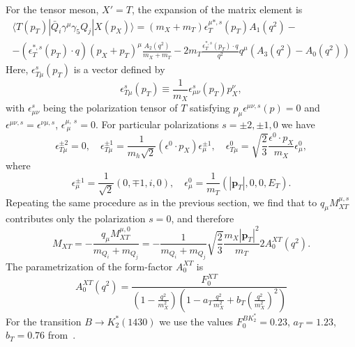 \documentclass[a4paper,12pt,dvipsnames,usernames]{article}
\begin{document}
For the tensor meson, $X' = T$, the expansion of the matrix element is~\cite{Li:2010ra,Cheng:2010yd}
    \begin{multline}
    \langle T(p_{T})| \bar{Q}_{i}\gamma^{\mu}\gamma_{5}Q_{j} |X(p_{X})\rangle = (m_{X}+m_{T})\epsilon^{\mu *,s}_{T}(p_{T})A_{1}(q^{2}) - \\ -(\epsilon^{*,s}_{T}(p_{T})\cdot q)(p_{X} + p_{T})^{\mu}\frac{A_{2}(q^{2})}{m_{X}+m_{T}}-2m_{T}\frac{\epsilon^{*,s}_{T}(p_{T})\cdot q}{q^{2}}q^{\mu}(A_{3}(q^{2})-A_{0}(q^{2}))
    \label{eq:tensor-form-factor-axial-part}
\end{multline}
Here, $\epsilon^{s}_{T\mu}(p_{T})$ is a vector defined by
\begin{equation}
    \epsilon_{T\mu}^{s}(p_{T}) \equiv  \frac{1}{m_{X}}\epsilon_{\mu\nu}^{s}(p_{T})p_{X}^{\nu},
\end{equation}
with $\epsilon_{\mu\nu}^{s}$ being the polarization tensor of $T$ satisfying $p_{\mu}\epsilon^{\mu\nu,s}(p) = 0$ and $\epsilon^{\mu\nu,s} = \epsilon^{\nu\mu,s}$, $\epsilon^{\mu, \ s}_{\ \mu} = 0$. For particular polarizations $s = \pm 2, \pm 1, 0$ we have~\cite{Li:2010ra}
\begin{equation}
    \epsilon^{\pm 2}_{T\mu} = 0, \quad \epsilon_{T\mu}^{\pm 1} = \frac{1}{m_{h}\sqrt{2}}(\epsilon^{0}\cdot p_{X})\epsilon^{\pm 1}_{\mu}, \quad \epsilon^{0}_{T\mu} = \sqrt{\frac{2}{3}}\frac{\epsilon^{0}\cdot p_{X}}{m_{X}}\epsilon_{\mu}^{0},
\end{equation}
where
\begin{equation}
    \epsilon^{\pm 1}_{\mu} = \frac{1}{\sqrt{2}}(0, \mp 1, i, 0), \quad \epsilon_{\mu}^{0} = \frac{1}{m_{T}}(|\bm{p}_{T}|,0,0,E_{T}).
\end{equation}
Repeating the same procedure as in the previous section, we find that to $q_{\mu}M^{\mu,s}_{XT}$ contributes only the polarization $s = 0$, and therefore
\begin{equation}
    M_{XT}  = -\frac{q_{\mu}M^{\mu, 0}_{XT}}{m_{Q_{i}}+m_{Q_{j}}}= -\frac{1}{m_{Q_{i}}+m_{Q_{j}}}\sqrt{\frac{2}{3}}\frac{m_{X}|\bm{p}_{T}|^{2}}{m_{T}}2 A^{XT}_{0}(q^{2}).
\end{equation}
The parametrization of the form-factor $A^{XT}_{0}$ is~\cite{Li:2010ra,Cheng:2010yd}
\begin{equation}
A^{XT}_{0}(q^{2}) = \frac{F^{XT}_{0}}{\left( 1-\frac{q^{2}}{m_{X}^{2}}\right)\left( 1-a_{T}\frac{q^{2}}{m_{X}^{2}}+b_{T}\left(\frac{q^{2}}{m_{X}^{2}}\right)^{2}\right)}
\end{equation}
For the transition $B\to K_{2}^{*}(1430)$ we use the values $F^{BK_{2}^{*}}_{0} = 0.23$, $a_{T} = 1.23$, $b_{T} = 0.76$ from~\cite{Cheng:2010yd}.
\end{document}
